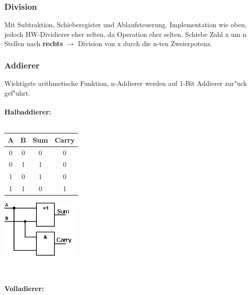 \subsubsection{Division}
Mit Subtraktion, Schieberegister und Ablaufsteuerung. 
Implementation wie oben, jedoch HW-Dividierer eher selten, da Operation eher selten. Schiebe Zahl x um n Stellen nach \textbf{rechts} $\rightarrow$ Division von x durch die n-ten Zweierpotenz.\\
\subsubsection{Addierer}
Wichtigste arithmetische Funktion, n-Addierer werden auf 1-Bit Addierer zur"uck gef"uhrt. \\ \\
\textbf{Halbaddierer:}\\ \\
\begin{minipage}{0.5\textwidth}
	\centering
	\begin{tabular}{|c | c | c | c |}
	\hline
	A & B & Sum & Carry\\
	\hline
	0 & 0 & 0 & 0\\
	\hline
	0 & 1 & 1 & 0\\
	\hline
	1 & 0 & 1 & 0\\
	\hline
	1 & 1 & 0 & 1\\
	\hline
	\end{tabular}
\end{minipage}
\begin{minipage}{0.9\textwidth}
	\centering
	\begin{flushleft}
	{\includegraphics[width=0.3\textwidth]{images/Arithmetik/halbaddierer.png}}
	\label{Fig: Halbaddierer}
	\end{flushleft}
\end{minipage}\\ \\

\newpage
\textbf{Volladierer:}\\ \\

